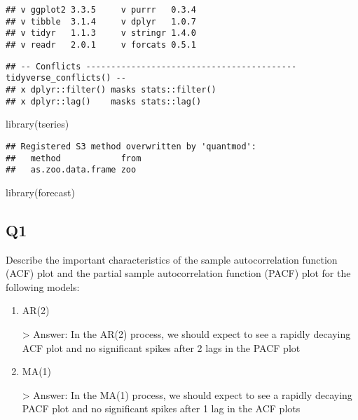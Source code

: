 \documentclass[
]{article}
\newenvironment{Shaded}{\begin{snugshade}}{\end{snugshade}}
\newcommand{\FunctionTok}[1]{\textcolor[rgb]{0.00,0.00,0.00}{#1}}
\newcommand{\NormalTok}[1]{#1}
\begin{document}
\begin{verbatim}
## v ggplot2 3.3.5     v purrr   0.3.4
## v tibble  3.1.4     v dplyr   1.0.7
## v tidyr   1.1.3     v stringr 1.4.0
## v readr   2.0.1     v forcats 0.5.1
\end{verbatim}

\begin{verbatim}
## -- Conflicts ------------------------------------------ tidyverse_conflicts() --
## x dplyr::filter() masks stats::filter()
## x dplyr::lag()    masks stats::lag()
\end{verbatim}

\begin{Shaded}
\begin{Highlighting}[]
\FunctionTok{library}\NormalTok{(tseries)}
\end{Highlighting}
\end{Shaded}

\begin{verbatim}
## Registered S3 method overwritten by 'quantmod':
##   method            from
##   as.zoo.data.frame zoo
\end{verbatim}

\begin{Shaded}
\begin{Highlighting}[]
\FunctionTok{library}\NormalTok{(forecast)}
\end{Highlighting}
\end{Shaded}

\hypertarget{q1}{%
\subsection{Q1}\label{q1}}

Describe the important characteristics of the sample autocorrelation
function (ACF) plot and the partial sample autocorrelation function
(PACF) plot for the following models:

\begin{enumerate}[label=(\alph*)]

\item AR(2)

> Answer: In the AR(2) process, we should expect to see a rapidly decaying 
ACF plot and no significant spikes after 2 lags in the PACF plot

\item MA(1)

> Answer: In the MA(1) process, we should expect to see a rapidly decaying 
PACF plot and no significant spikes after 1 lag in the ACF plots

\end{enumerate}
\end{document}
